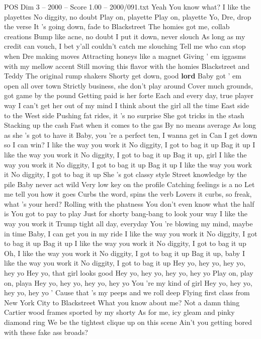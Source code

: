 \begin{textsample}{POS Dim 3 – 2000 – Score 1.00 – 2000/091.txt}  \label{ex:f3_pos_035}
Yeah You know what?
I like the playettes No diggity, no doubt Play on, playette Play on, playette Yo, Dre, drop the verse It 's going down, fade to Blackstreet The homies got me, collab creations Bump like acne, no doubt I put it down, never slouch As long as my credit can vouch, I bet y'all couldn't catch me slouching Tell me who can stop when Dre making moves Attracting honeys like a magnet Giving ' em iggasms with my mellow accent Still moving this flavor with the homies Blackstreet and Teddy The original rump shakers Shorty get down, good \textbf{lord} Baby got ' em open all over town Strictly business, she don't play around Cover much grounds, got game by the pound Getting paid is her forte Each and every day, true player way I can't get her out of my mind I think about the girl all the time East side to the West side Pushing fat rides, it 's no surprise She got tricks in the stash Stacking up the cash Fast when it comes to the gas By no means average As long as she 's got to have it Baby, you 're a perfect ten, I wanna get in Can I get down so I can win?
I like the way you work it No diggity, I got to bag it up Bag it up I like the way you work it No diggity, I got to bag it up Bag it up, girl I like the way you work it No diggity, I got to bag it up Bag it up I like the way you work it No diggity, I got to bag it up She 's got classy style Street knowledge by the pile Baby never act wild Very low key on the profile Catching feelings is a no Let me tell you how it goes Curbs the word, spins the verb Lovers it curbs, so freak, what 's your herd?
Rolling with the phatness You don't even know what the half is You got to pay to play Just for shorty bang-bang to look your way I like the way you work it Trump tight all day, everyday You 're blowing my mind, maybe in time Baby, I can get you in my ride I like the way you work it No diggity, I got to bag it up Bag it up I like the way you work it No diggity, I got to bag it up Oh, I like the way you work it No diggity, I got to bag it up Bag it up, baby I like the way you work it No diggity, I got to bag it up Hey yo, hey yo, hey yo, hey yo Hey yo, that girl looks good Hey yo, hey yo, hey yo, hey yo Play on, play on, playa Hey yo, hey yo, hey yo, hey yo You 're my kind of girl Hey yo, hey yo, hey yo, hey yo ' Cause that 's my peeps and we roll deep Flying first class from New York City to Blackstreet What you know about me?
Not a damn thing Cartier wood frames sported by my shorty As for me, icy gleam and pinky diamond ring We be the tightest clique up on this scene Ain't you getting bored with these fake ass broads?

\end{textsample}

